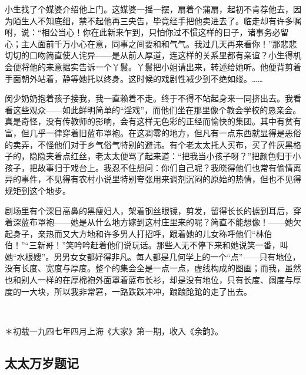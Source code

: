 \par 小生找了个媒婆介绍他上门。这媒婆一摇一摆，扇着个蒲扇，起初不肯荐他去，因为陌生人不知底细，禁不起他再三央告，毕竟经手把他卖进去了。临走却有许多嘱咐，说：“相公当心！你在此新来乍到，只怕你过不惯这样的日子，诸事务必留心；主人面前千万小心在意，同事之间要和和气气。我过几天再来看你！”那悲悲切切的口吻简直使人诧异——是从前人厚道，连这样的关系里都有亲谊？小生得机会便将他的来意据实告诉一个丫鬟。丫鬟把小姐请出来，转述给她听。他便背剪着手面朝外站着，静等她托以终身。这时候的戏剧性减少到不绝如缕。……
\par 闵少奶奶抱着孩子接我，我一直赖着不走。终于不得不站起身来一同挤出去。我看看这些观众——如此鲜明简单的“淫戏”，而他们坐在那里像个教会学校的恳亲会。真是奇怪，没有传教师的影响，会有这样无色彩的正经而愉快的集团。其中有贫有富，但几乎一律穿着旧蓝布罩袍。在这凋零的地方，但凡有一点东西就显得是恶俗的卖弄，不怪他们对于乡气俗气特别的避讳。有个老太太托人买布，买了件灰黑格子的，隐隐夹着点红丝，老太太便骂了起来道：“把我当小孩子呀？”把颜色归于小孩子，把故事归于戏台上。我忍不住想问：你们自己呢？我晓得他们也常有偷情离异的事件，不见得有农村小说里特别夸张用来调剂沉闷的原始的热情，但也不见得规矩到这个地步。
\par 剧场里有个深目高鼻的黑瘦妇人，架着钢丝眼镜，剪发，留得长长的掳到耳后，穿着深蓝布罩袍——她是从什么地方嫁到这村庄里来的呢？简直不能想像！——她欠起身子，亲热而又大方地和许多男人打招呼，跟着她的儿女称呼他们“林伯伯！”“三新哥！”笑吟吟赶着他们说玩话。那些人无不停下来和她说笑一番，叫她“水根嫂”。男男女女都好得非凡。每人都是几何学上的一个“点”——只有地位，没有长度、宽度与厚度。整个的集会全是一点一点，虚线构成的图画；而我，虽然也和别人一样的在厚棉袍外面罩着蓝布长衫，却是没有地位，只有长度、阔度与厚度的一大块，所以我非常窘，一路跌跌冲冲，踉踉跄跄的走了出去。
\par {}
\par {}
\par  
\par ＊初载一九四七年四月上海《大家》第一期，收入《余韵》。

\subsection{太太万岁题记}

